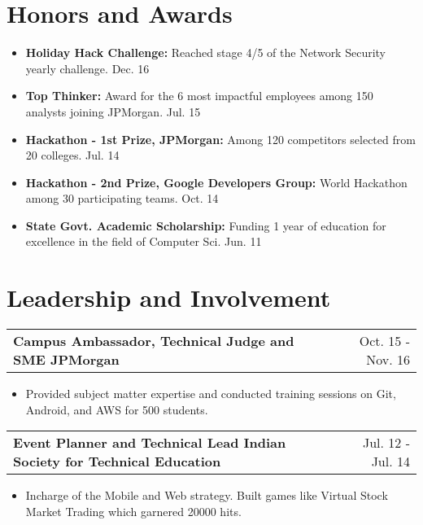 \documentclass[a4paper,10pt]{article}
\makeatletter
\newcommand{\projectHeading}[2]{
    \begin{tabular*}{1\textwidth}{l@{\extracolsep{\fill}}r}
      \large{\textbf{#1}} & \small{#2} 
    \end{tabular*}
}
\newcommand{\resumeItemListStart}{\begin{itemize}[topsep=2.2pt, parsep=1pt, listparindent=0pt, itemindent=0pt, itemsep=1pt, leftmargin=*]}
\newcommand{\resumeItemListEnd}{\end{itemize}}
\makeatother
\begin{document}
\section{Honors and Awards}
  \resumeItemListStart
    \item\small{\textbf{Holiday Hack Challenge: }
  	  {Reached stage 4/5 of the Network Security yearly challenge.}\hfill{} {Dec. 16}}
    \item\small{\textbf{Top Thinker: }
      {Award for the 6 most impactful employees among 150 analysts joining JPMorgan.}\hfill{} {Jul. 15}}
    \item\small{\textbf{Hackathon - 1st Prize, JPMorgan: }
      {Among 120 competitors selected from 20 colleges.}\hfill{} {Jul. 14}}
    \item\small{\textbf{Hackathon - 2nd Prize, Google Developers Group: }
      {World Hackathon among 30 participating teams.}\hfill{} {Oct. 14}}
    \item\small{\textbf{State Govt. Academic Scholarship: }
    {Funding 1 year of education for excellence in the field of Computer Sci.}\hfill{} {Jun. 11}}
  \resumeItemListEnd


\section{Leadership and Involvement}
    
    \projectHeading{Campus Ambassador, Technical Judge and SME \textbar{} JPMorgan}{Oct. 15 - Nov. 16}
    \resumeItemListStart
    	\item\small{Provided subject matter expertise and conducted training sessions on Git, Android, and AWS for 500 students.}
    \resumeItemListEnd
    
    \projectHeading{Event Planner and Technical Lead \textbar{} Indian Society for Technical Education }{Jul. 12 - Jul. 14}
    \resumeItemListStart
    	\item\small{Incharge of the Mobile and Web strategy. Built games like Virtual Stock Market Trading which garnered 20000 hits.}
    \resumeItemListEnd
    

\end{document}
